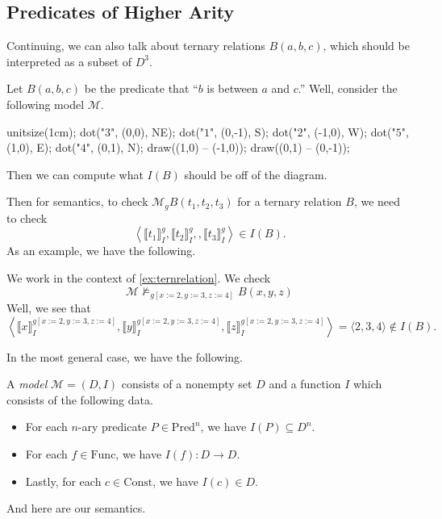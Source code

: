 \subsection{Predicates of Higher Arity}
Continuing, we can also talk about ternary relations $B(a,b,c)$, which should be interpreted as a subset of $D^3$.
\begin{example} \label{ex:ternrelation}
	Let $B(a,b,c)$ be the predicate that ``$b$ is between $a$ and $c$.'' Well, consider the following model $\mathcal M$.
	\begin{center}
		\begin{asy}
			unitsize(1cm);
			dot("$3$", (0,0), NE);
			dot("$1$", (0,-1), S);
			dot("$2$", (-1,0), W);
			dot("$5$", (1,0), E);
			dot("$4$", (0,1), N);
			draw((1,0) -- (-1,0));
			draw((0,1) -- (0,-1));
		\end{asy}
	\end{center}
	Then we can compute what $I(B)$ should be off of the diagram.
\end{example}
Then for semantics, to check $\mathcal M_gB(t_1,t_2,t_3)$ for a ternary relation $B$, we need to check
\[\left\langle\llbracket t_1\rrbracket_I^g,\llbracket t_2\rrbracket_I^g,,\llbracket t_3\rrbracket_I^g\right\rangle\in I(B).\]
As an example, we have the following.
\begin{example}
	We work in the context of \autoref{ex:ternrelation}. We check
	\[\mathcal M\nvDash_{g[x:=2,y:=3,z:=4]}B(x,y,z)\]
	Well, we see that
	\[\left\langle\llbracket x\rrbracket_I^{g[x:=2,y:=3,z:=4]},\llbracket y\rrbracket_I^{g[x:=2,y:=3,z:=4]},\llbracket z\rrbracket_I^{g[x:=2,y:=3,z:=4]}\right\rangle=\langle2,3,4\rangle\notin I(B).\]
\end{example}
In the most general case, we have the following.
\begin{defihelper}[Model]
	A \textit{model} $\mathcal M=(D,I)$ consists of a nonempty set $D$ and a function $I$ which consists of the following data.
	\begin{itemize}
		\item For each $n$-ary predicate $P\in\mathrm{Pred}^n$, we have $I(P)\subseteq D^n$.
		\item For each $f\in\mathrm{Func}$, we have $I(f):D\to D$.
		\item Lastly, for each $c\in\mathrm{Const}$, we have $I(c)\in D$.
	\end{itemize}
\end{defihelper}
And here are our semantics.
